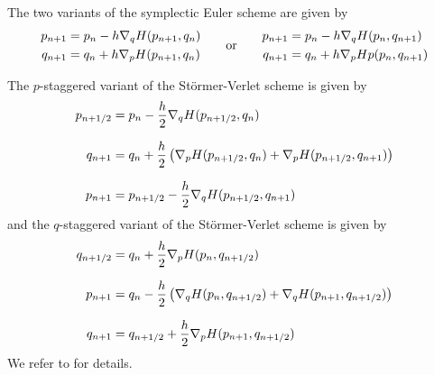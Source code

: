 \documentclass[twoside,a4paper]{article}
\begin{document}
The two variants of the symplectic Euler scheme are given by
\begin{equation*}
	\begin{split}
			p_{n+1} &= p_n - h \grad[q]{H} (p_{n+1}, q_n) \\
			q_{n+1} &= q_n + h \grad[p]{H}(p_{n+1}, q_n)	
	\end{split}
	\quad\quad \text{or} \quad\quad
	\begin{split}
			p_{n+1} &= p_n - h \grad[q]{H}(p_n, q_{n+1}) \\
			q_{n+1} &= q_n + h \grad[p]{H}{p}(p_n, q_{n+1})	
	\end{split}
\end{equation*}

The $p$-staggered variant of the Störmer-Verlet scheme is given by
\begin{align*}
	p_{n+1/2} &= p_n - \frac{h}{2} \grad[q]{H}(p_{n+1/2}, q_n) \\[7pt]
	q_{n+1} &= q_n + \frac{h}{2} \lb \grad[p]{H}(p_{n+1/2}, q_n) + \grad[p]{H}(p_{n+1/2}, q_{n+1}) \rb \\[7pt]
	p_{n+1} &= p_{n+1/2} - \frac{h}{2} \grad[q]{H}(p_{n+1/2}, q_{n+1})
\end{align*}
and the $q$-staggered variant of the Störmer-Verlet scheme is given by
\begin{align*}
	q_{n+1/2} &= q_n + \frac{h}{2} \grad[p]{H}(p_n, q_{n+1/2}) \\[7pt]
	p_{n+1} &= q_n - \frac{h}{2} \lb \grad[q]{H}(p_n, q_{n+1/2}) + \grad[q]{H}(p_{n+1}, q_{n+1/2}) \rb \\[7pt]
	q_{n+1} &= q_{n+1/2} + \frac{h}{2} \grad[p]{H}(p_{n+1}, q_{n+1/2})
\end{align*}
We refer to \citet[p.~189 and p.~190]{hairer2006} for details.
\end{document}
